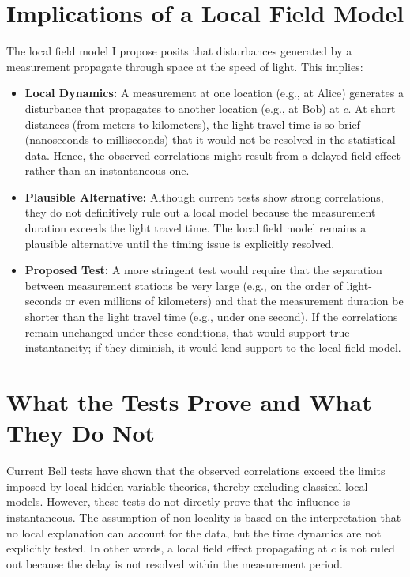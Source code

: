 \documentclass[12pt,landscape]{article}
\begin{document}
	\section*{Implications of a Local Field Model}
	The local field model I propose posits that disturbances generated by a measurement propagate through space at the speed of light. This implies:
	\begin{itemize}
		\item \textbf{Local Dynamics:} A measurement at one location (e.g., at Alice) generates a disturbance that propagates to another location (e.g., at Bob) at $c$. At short distances (from meters to kilometers), the light travel time is so brief (nanoseconds to milliseconds) that it would not be resolved in the statistical data. Hence, the observed correlations might result from a delayed field effect rather than an instantaneous one.
		\item \textbf{Plausible Alternative:} Although current tests show strong correlations, they do not definitively rule out a local model because the measurement duration exceeds the light travel time. The local field model remains a plausible alternative until the timing issue is explicitly resolved.
		\item \textbf{Proposed Test:} A more stringent test would require that the separation between measurement stations be very large (e.g., on the order of light-seconds or even millions of kilometers) and that the measurement duration be shorter than the light travel time (e.g., under one second). If the correlations remain unchanged under these conditions, that would support true instantaneity; if they diminish, it would lend support to the local field model.
	\end{itemize}
	
	\section*{What the Tests Prove and What They Do Not}
	Current Bell tests have shown that the observed correlations exceed the limits imposed by local hidden variable theories, thereby excluding classical local models. However, these tests do not directly prove that the influence is instantaneous. The assumption of non-locality is based on the interpretation that no local explanation can account for the data, but the time dynamics are not explicitly tested. In other words, a local field effect propagating at $c$ is not ruled out because the delay is not resolved within the measurement period.
	
\end{document}
